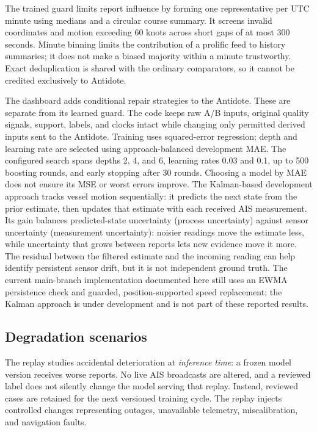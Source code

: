 \documentclass[11pt]{article}
\begin{document}
The trained guard limits report influence by forming one representative per UTC minute using medians and a circular course summary. It screens invalid coordinates and motion exceeding 60 knots across short gaps of at most 300 seconds. Minute binning limits the contribution of a prolific feed to history summaries; it does not make a biased majority within a minute trustworthy. Exact deduplication is shared with the ordinary comparators, so it cannot be credited exclusively to Antidote.

The dashboard adds conditional repair strategies to the Antidote. These are separate from its learned guard. The code keeps raw A/B inputs, original quality signals, support, labels, and clocks intact while changing only permitted derived inputs sent to the Antidote. Training uses squared-error regression; depth and learning rate are selected using approach-balanced development MAE. The configured search spans depths 2, 4, and 6, learning rates 0.03 and 0.1, up to 500 boosting rounds, and early stopping after 30 rounds. Choosing a model by MAE does not ensure its MSE or worst errors improve. The Kalman-based development approach tracks vessel motion sequentially: it predicts the next state from the prior estimate, then updates that estimate with each received AIS measurement. Its gain balances predicted-state uncertainty (process uncertainty) against sensor uncertainty (measurement uncertainty): noisier readings move the estimate less, while uncertainty that grows between reports lets new evidence move it more. The residual between the filtered estimate and the incoming reading can help identify persistent sensor drift, but it is not independent ground truth. The current main-branch implementation documented here still uses an EWMA persistence check and guarded, position-supported speed replacement; the Kalman approach is under development and is not part of these reported results.

\subsection{Degradation scenarios}
The replay studies accidental deterioration at \emph{inference time}: a frozen model version receives worse reports. No live AIS broadcasts are altered, and a reviewed label does not silently change the model serving that replay. Instead, reviewed cases are retained for the next versioned training cycle. The replay injects controlled changes representing outages, unavailable telemetry, miscalibration, and navigation faults.
\end{document}
